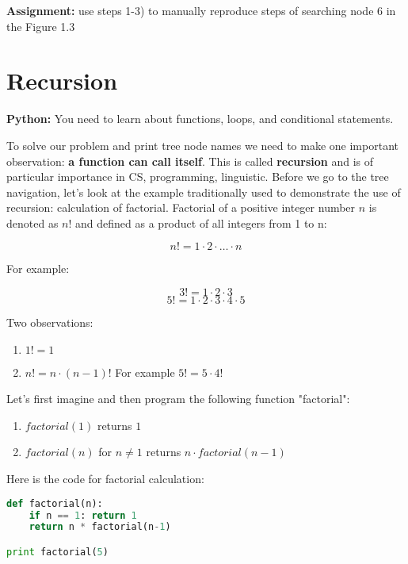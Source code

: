 \bigskip
\begin{tcolorbox}
\textbf{Assignment:} use steps 1-3) to manually reproduce 
steps of searching node 6 in
the Figure 1.3 
\end{tcolorbox}

\section{Recursion}

\begin{tcolorbox}
\textbf{Python:} 
You need to learn about functions, loops, and conditional statements.
\end{tcolorbox}

To solve our problem and print tree node names we need
to make one important observation: \textbf{a function can call itself}.
This is called \textbf{recursion} and is of particular importance in
CS, programming, linguistic. Before we go to the tree navigation,
let's look at the example traditionally used to demonstrate
the use of recursion: calculation of factorial. Factorial of a
positive integer number $n$
is denoted as $n!$ and defined as a product of all integers
from 1 to n:

$$n! = 1 \cdot 2 \cdot\dots\cdot n$$

For example:

$$3! = 1\cdot 2\cdot 3$$
$$5! = 1\cdot 2\cdot 3\cdot 4\cdot 5$$

Two observations:

\begin{leftborder}
\begin{enumerate}
\item $1! = 1$
\item $n! = n\cdot (n-1)!$ For example $5! = 5\cdot 4!$
\end{enumerate}
\end{leftborder}

Let's first imagine and then program the following function "factorial":

\begin{leftborder}
\begin{enumerate}
\item $factorial(1)$ returns $1$
\item $factorial(n)$ for $n\neq 1$ returns $n\cdot factorial(n-1)$
\end{enumerate}
\end{leftborder}

Here is the code for factorial calculation:
\begin{lstlisting}[style=codelst,language=Python,caption={Python: factorial}]
def factorial(n):
    if n == 1: return 1
    return n * factorial(n-1)

print factorial(5)
\end{lstlisting}


